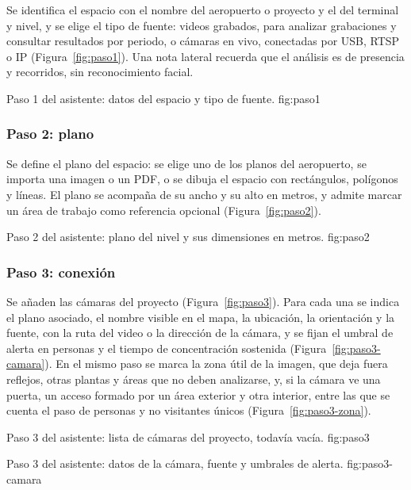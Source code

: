 Se identifica el espacio con el nombre del aeropuerto o proyecto y el del
terminal y nivel, y se elige el tipo de fuente: videos grabados, para
analizar grabaciones y consultar resultados por periodo, o cámaras en
vivo, conectadas por USB, RTSP o IP (Figura~\ref{fig:paso1}). Una nota
lateral recuerda que el análisis es de presencia y recorridos, sin
reconocimiento facial.

  {Paso 1 del asistente: datos del espacio y tipo de fuente.}
  {fig:paso1}

\subsubsection*{Paso 2: plano}

Se define el plano del espacio: se elige uno de los planos del
aeropuerto, se importa una imagen o un PDF, o se dibuja el espacio con
rectángulos, polígonos y líneas. El plano se acompaña de su ancho y su
alto en metros, y admite marcar un área de trabajo como referencia
opcional (Figura~\ref{fig:paso2}).

  {Paso 2 del asistente: plano del nivel y sus dimensiones en metros.}
  {fig:paso2}

\subsubsection*{Paso 3: conexión}

Se añaden las cámaras del proyecto (Figura~\ref{fig:paso3}). Para cada
una se indica el plano asociado, el nombre visible en el mapa, la
ubicación, la orientación y la fuente, con la ruta del video o la
dirección de la cámara, y se fijan el umbral de alerta en personas y el
tiempo de concentración sostenida (Figura~\ref{fig:paso3-camara}). En el
mismo paso se marca la zona útil de la imagen, que deja fuera reflejos,
otras plantas y áreas que no deben analizarse, y, si la cámara ve una
puerta, un acceso formado por un área exterior y otra interior, entre las
que se cuenta el paso de personas y no visitantes únicos
(Figura~\ref{fig:paso3-zona}).

  {Paso 3 del asistente: lista de cámaras del proyecto, todavía vacía.}
  {fig:paso3}

  {Paso 3 del asistente: datos de la cámara, fuente y umbrales de alerta.}
  {fig:paso3-camara}

